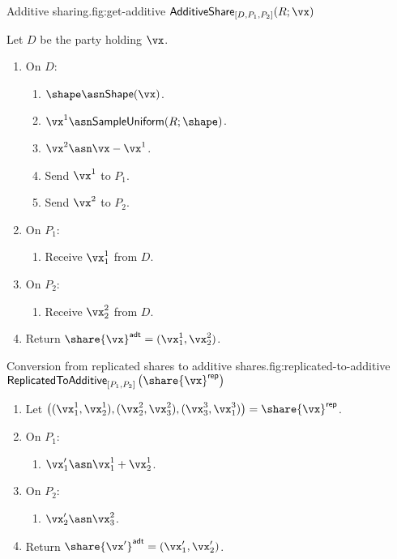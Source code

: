 \begin{Boxfig}{Additive sharing.}{fig:get-additive}
  {$\mathsf{AdditiveShare}_{[D, P_1, P_2]}(R; \vx)$}

  Let $D$ be the party holding $\vx$.

  \begin{enumerate}
    \item On $D$:
  \begin{enumerate}
    \item $\shape \asn \mathsf{Shape}(\vx)$.
    \item $\vx^1 \asn \mathsf{SampleUniform}(R; \shape)$.
    \item $\vx^2 \asn \vx - \vx^1$.
    \item Send $\vx^1$ to $P_1$.
    \item Send $\vx^2$ to $P_2$.
  \end{enumerate}
  \item On $P_1$:
  \begin{enumerate}
      \item Receive $\vx^1_1$ from $D$.
  \end{enumerate}
  \item On $P_2$:
  \begin{enumerate}
      \item Receive $\vx^2_2$ from $D$.
  \end{enumerate}
  \item Return $\share{\vx}^{\mathsf{adt}} = (\vx^1_1, \vx^2_2)$.
\end{enumerate}
\end{Boxfig}

\begin{Boxfig}{Conversion from replicated shares to additive shares.}{fig:replicated-to-additive}
  {$\mathsf{ReplicatedToAdditive}_{[P_1, P_2]}\left( \share{\vx}^{\mathsf{rep}} \right)$}

  \begin{enumerate}

  \item Let $\left( (\vx_1^1, \vx_2^1), (\vx_2^2, \vx_3^2), (\vx_3^3, \vx_1^3) \right) = \share{\vx}^{\mathsf{rep}}$.

  \item On $P_1$:
    \begin{enumerate}
    \item $\vx'_1 \asn \vx^1_1 + \vx^1_2$.
    \end{enumerate}

  \item On $P_2$:
    \begin{enumerate}
    \item $\vx'_2 \asn \vx^2_3$.
    \end{enumerate}

  \item Return $\share{\vx'}^{\mathsf{adt}} = (\vx'_1, \vx'_2)$.
\end{enumerate}
\end{Boxfig}








